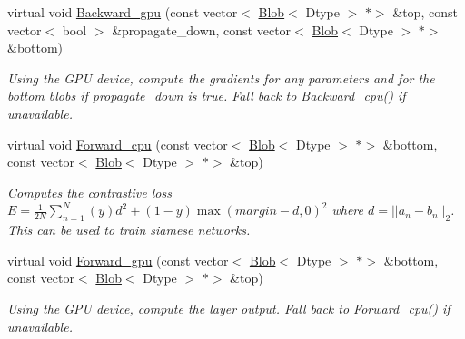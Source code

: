 \begin{DoxyCompactItemize}
\mbox{\label{classcaffe_1_1_contrastive_loss_layer_a1501e5437e3f0929da03a1046559dd06}} 
virtual void \mbox{\hyperlink{classcaffe_1_1_contrastive_loss_layer_a1501e5437e3f0929da03a1046559dd06}{Backward\+\_\+gpu}} (const vector$<$ \mbox{\hyperlink{classcaffe_1_1_blob}{Blob}}$<$ Dtype $>$ $\ast$$>$ \&top, const vector$<$ bool $>$ \&propagate\+\_\+down, const vector$<$ \mbox{\hyperlink{classcaffe_1_1_blob}{Blob}}$<$ Dtype $>$ $\ast$$>$ \&bottom)
\begin{DoxyCompactList}\small\item\em Using the G\+PU device, compute the gradients for any parameters and for the bottom blobs if propagate\+\_\+down is true. Fall back to \mbox{\hyperlink{classcaffe_1_1_contrastive_loss_layer_a60af9729fe340be3ae0f87737215d9d0}{Backward\+\_\+cpu()}} if unavailable. \end{DoxyCompactList}\item 
virtual void \mbox{\hyperlink{classcaffe_1_1_contrastive_loss_layer_aad90e509c2f7ebd3a36054101d1d15fb}{Forward\+\_\+cpu}} (const vector$<$ \mbox{\hyperlink{classcaffe_1_1_blob}{Blob}}$<$ Dtype $>$ $\ast$$>$ \&bottom, const vector$<$ \mbox{\hyperlink{classcaffe_1_1_blob}{Blob}}$<$ Dtype $>$ $\ast$$>$ \&top)
\begin{DoxyCompactList}\small\item\em Computes the contrastive loss $ E = \frac{1}{2N} \sum\limits_{n=1}^N \left(y\right) d^2 + \left(1-y\right) \max \left(margin-d, 0\right)^2 $ where $ d = \left| \left| a_n - b_n \right| \right|_2 $. This can be used to train siamese networks. \end{DoxyCompactList}\item 
\mbox{\label{classcaffe_1_1_contrastive_loss_layer_abf66587f81d75255e4619c09a95da566}} 
virtual void \mbox{\hyperlink{classcaffe_1_1_contrastive_loss_layer_abf66587f81d75255e4619c09a95da566}{Forward\+\_\+gpu}} (const vector$<$ \mbox{\hyperlink{classcaffe_1_1_blob}{Blob}}$<$ Dtype $>$ $\ast$$>$ \&bottom, const vector$<$ \mbox{\hyperlink{classcaffe_1_1_blob}{Blob}}$<$ Dtype $>$ $\ast$$>$ \&top)
\begin{DoxyCompactList}\small\item\em Using the G\+PU device, compute the layer output. Fall back to \mbox{\hyperlink{classcaffe_1_1_contrastive_loss_layer_ae55966330621c1a2bd5a0012f2b09fe4}{Forward\+\_\+cpu()}} if unavailable. \end{DoxyCompactList}\item 

\end{DoxyCompactItemize}

